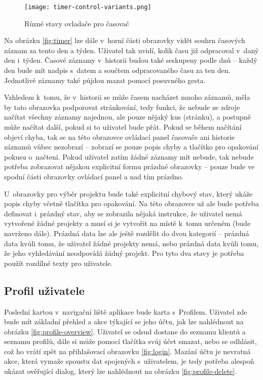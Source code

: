 \begin{figure}[h]
	\centering
	\texttt{[image: timer-control-variants.png]}
	\caption{Různé stavy ovladače pro časovač}
	\label{fig:timer-control-variants}
\end{figure}

Na obrázku \ref{fig:timer} lze dále v~horní části obrazovky vidět souhrn časových záznam za tento den a týden. Uživatel tak uvidí, kolik času již odpracoval v~daný den i~týden. Časové záznamy v~historii budou také seskupeny podle dnů – každý den bude mít nadpis s~datem a součtem odpracovaného času za ten den. Jednotlivé záznamy také půjdou mazat pomocí posuvného gesta.

Vzhledem k~tomu, že v~historii se může časem nacházet mnoho záznamů, měla by tato obrazovka podporovat stránkování, tedy funkci, že nebude ze zdroje načítat všechny záznamy najednou, ale pouze nějaký kus (stránku), a postupně může načítat další, pokud si to uživatel bude přát. Pokud se během načítání objeví chyba, tak se na této obrazovce ovládací panel časovače ani historie záznamů vůbec nezobrazí – zobrazí se pouze popis chyby a tlačítko pro opakování pokusu o~načtení. Pokud uživatel zatím žádné záznamy mít nebude, tak nebude potřeba zobrazovat nějakou explicitní formu prázdné obrazovky – pouze bude ve spodní části obrazovky ovládací panel a nad tím prázdno.

U~obrazovky pro výběr projektu bude také explicitní chybový stav, který ukáže popis chyby včetně tlačítka pro opakování. Na této obrazovce už ale bude potřeba definovat i~prázdný stav, aby se zobrazila nějaká instrukce, že uživatel nemá vytvořené žádné projekty a musí si je vytvořit na místě k~tomu určeném (bude navrženo dále). Prázdná data lze ale ještě rozdělit do dvou kategorií – prázdná data kvůli tomu, že uživatel žádné projekty nemá, nebo prázdná data kvůli tomu, že jeho vyhledávání neodpovídá žádný projekt. Pro tyto dva stavy je potřeba použít rozdílné texty pro uživatele.

\subsection{Profil uživatele}\label{feature-profile}

Poslední kartou v~navigační liště aplikace bude karta s~Profilem. Uživatel zde bude mít základní přehled a akce týkající se jeho účtu, jak lze nahlédnout na obrázku \ref{fig:profile-overview}. Uživatel se odsud dostane do seznamu klientů a seznamu profilů, dále si může pomocí tlačítka svůj účet smazat, nebo se odhlásit, což ho vrátí zpět na přihlašovací obrazovku \ref{fig:login}. Mazání účtu je nevratná akce, která vymaže spoustu dat spojených s~uživatelem, je tedy potřeba alespoň ukázat ověřující dialog, který lze nahlédnout na obrázku \ref{fig:profile-delete}. 

